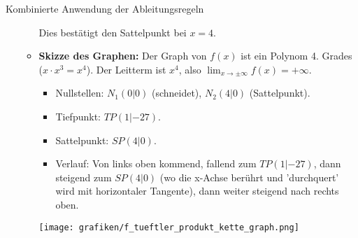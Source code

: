 \begin{loesungsumgebung}{Kombinierte Anwendung der Ableitungsregeln}
\begin{enumerate}[label=(\alph*)]
\begin{itemize}
        Dies bestätigt den Sattelpunkt bei $x=4$.
        \item \textbf{Skizze des Graphen:}
        Der Graph von $f(x)$ ist ein Polynom 4. Grades ($x \cdot x^3 = x^4$). Der Leitterm ist $x^4$, also $\lim_{x \to \pm\infty} f(x) = +\infty$.
        \begin{itemize}
            \item Nullstellen: $N_1(0|0)$ (schneidet), $N_2(4|0)$ (Sattelpunkt).
            \item Tiefpunkt: $TP(1|-27)$.
            \item Sattelpunkt: $SP(4|0)$.
            \item Verlauf: Von links oben kommend, fallend zum $TP(1|-27)$, dann steigend zum $SP(4|0)$ (wo die x-Achse berührt und 'durchquert' wird mit horizontaler Tangente), dann weiter steigend nach rechts oben.
        \end{itemize}
        \begin{center}
        \texttt{[image: grafiken/f\_tueftler\_produkt\_kette\_graph.png]}
        \label{fig:f_tueftler_produkt_kette_graph}
        \end{center}
    \end{itemize}
\end{enumerate}

\end{loesungsumgebung}

